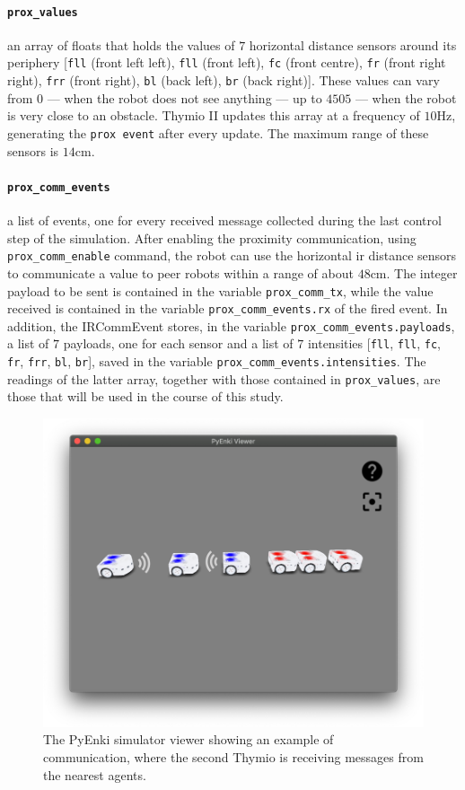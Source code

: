 \paragraph*{\texttt{prox\_values}}
 an array of floats that holds the values of $7$ horizontal distance sensors around 
 its periphery [\texttt{fll} (front left left), \texttt{fll} (front left), \texttt{fc} (front 
 centre), \texttt{fr} (front right right), \texttt{frr} (front right), \texttt{bl} (back left), 
 \texttt{br} (back right)]. 
These values can vary from $0$ — when the robot does not see anything — up to 
$4505$ — when the robot is very close to an obstacle. 
Thymio II updates this array at a frequency of $10$Hz, generating the 
\texttt{prox event} after every update. 
The maximum range of these sensors is $14$cm.

\paragraph*{\texttt{prox\_comm\_events}}

a list of events, one for every received message collected during the last control 
step of the simulation. 
After enabling the proximity communication, using \texttt{prox\_comm\_enable} 
command, the robot can use the horizontal \gls{ir} distance sensors to 
communicate a value to peer robots within a range of about $48$cm. 
The integer payload to be sent is contained in the variable 
\texttt{prox\_comm\_tx}, while the value received is contained in the variable 
\texttt{prox\_comm\_events.rx} of the fired event.
In addition, the IRCommEvent stores, in the variable 
\texttt{prox\_comm\_events.payloads}, a list of $7$ payloads, one for each sensor 
and a list of  $7$ intensities  [\texttt{fll}, \texttt{fll}, \texttt{fc}, \texttt{fr}, 
\texttt{frr}, \texttt{bl}, \texttt{br}], saved in the variable 
\texttt{prox\_comm\_events.intensities}.
The readings of the latter array, together with those contained in 
\texttt{prox\_values}, are those that will be used in the course of this study.

\begin{figure}[!htb]
	\centering
	\includegraphics[width=.6\textwidth]{contents/images/thymio-comm}
	\caption[Example of communication with the PyEnki simulator]{The PyEnki 
	simulator viewer showing an example of communication, 
	where the second Thymio is receiving messages from the nearest agents.}
	\label{fig:thymio comm}
\end{figure}

